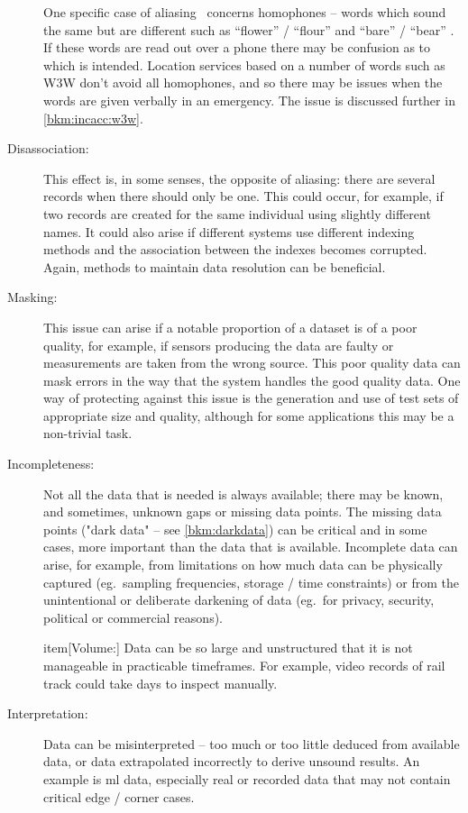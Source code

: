 \begin{description}
One specific case of aliasing \cbstart\ concerns \cbend homophones -- words which sound the same but are different such as ``flower'' / ``flour'' and ``bare'' / ``bear'' \cite{citation:homonym}.
If these words are read out over a phone there may be confusion as to which is intended.
Location services based on a number of words such as W3W don't avoid all homophones,
and so there may be issues when the words are given verbally in an emergency. The issue is discussed further in \autoref{bkm:incacc:w3w}.

\item[Disassociation:] This effect is, in some senses, the opposite of aliasing: there are several records when there should only be one. This could occur, for example, if two records are created for the same individual using slightly different names. It could also arise if different systems use different indexing methods and the association between the indexes becomes corrupted. Again, methods to maintain data resolution can be beneficial.

\item[Masking:] This issue can arise if a notable proportion of a \gls{dataset} is of a poor \cbstart\gls{quality}\cbend, for example, if sensors producing the data are faulty or measurements are taken from the wrong source. This poor quality data can mask errors in the way that the system handles the good quality data. One way of protecting against this issue is the generation and use of test sets of appropriate size and quality, although for some applications this may be a non-trivial task.

\item[Incompleteness:] Not all the data that is needed is always available; there may be known, and sometimes, unknown gaps or missing data points. The missing data points ("dark data" -- see \autoref{bkm:darkdata}) can be critical and in some cases, more important than the data that is available. Incomplete data can arise, for example, from limitations on how much data can be physically captured (eg.~sampling frequencies, storage / time constraints) or from the unintentional or deliberate darkening of data (eg.~for privacy, security, political or commercial reasons).

item[Volume:] Data can be so large and unstructured that it is not manageable in practicable timeframes.
For example, video records of rail track could take days to inspect manually.

\item[Interpretation:] Data can be misinterpreted -- too much or too little deduced from available data, or data extrapolated incorrectly to derive unsound results.
An example is \gls{ml} data, especially real or recorded data that may not contain critical edge / corner cases.


\end{description}
